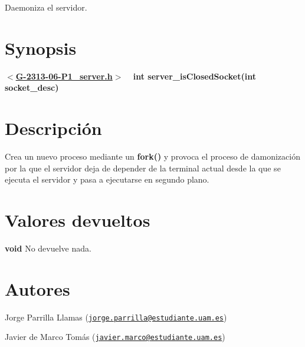 Daemoniza el servidor.\hypertarget{server_daemon_Synopsis}{}\section{Synopsis}\label{server_daemon_Synopsis}
{ {\bfseries $<$\hyperlink{G-2313-06-P1__server_8h_source}{G-\/2313-\/06-\/\+P1\+\_\+server.\+h}$>$} ~\newline
 {\bfseries int server\+\_\+is\+Closed\+Socket(int socket\+\_\+desc)} } \hypertarget{server_daemon_descripcion}{}\section{Descripción}\label{server_daemon_descripcion}
Crea un nuevo proceso mediante un {\bfseries fork()} y provoca el proceso de damonización por la que el servidor deja de depender de la terminal actual desde la que se ejecuta el servidor y pasa a ejecutarse en segundo plano.\hypertarget{server_daemon_return}{}\section{Valores devueltos}\label{server_daemon_return}

\begin{DoxyItemize}
\item {\bfseries void} No devuelve nada. 
\end{DoxyItemize}\hypertarget{server_daemon_authors}{}\section{Autores}\label{server_daemon_authors}

\begin{DoxyItemize}
\item Jorge Parrilla Llamas (\href{mailto:jorge.parrilla@estudiante.uam.es}{\tt jorge.\+parrilla@estudiante.\+uam.\+es}) 
\item Javier de Marco Tomás (\href{mailto:javier.marco@estudiante.uam.es}{\tt javier.\+marco@estudiante.\+uam.\+es}) 
\end{DoxyItemize}